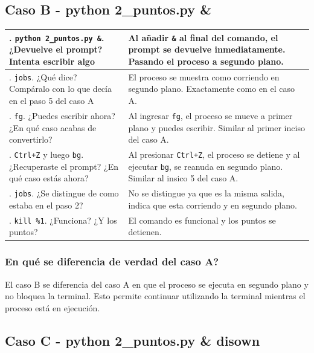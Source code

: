 \documentclass[12pt, letterpaper]{article}
\begin{document}
\subsection*{\fontsize{12}{17}\selectfont Caso B - python 2\_puntos.py \& }

\renewcommand{\arraystretch}{1.35}
\begin{xltabular}{\textwidth}{|>{\raggedright\arraybackslash}X|>{\raggedright\arraybackslash}X|}
		. \texttt{python 2\_puntos.py \&}. ¿Devuelve el prompt? Intenta escribir algo & Al añadir \texttt{\&} al final del comando, el prompt se devuelve inmediatamente. Pasando el proceso a segundo plano. \\ . \texttt{jobs}. ¿Qué dice? Compáralo con lo que decía en el paso 5 del caso A & El proceso se muestra como corriendo en segundo plano. Exactamente como en el caso A. \\ . \texttt{fg}. ¿Puedes escribir ahora? ¿En qué caso acabas de convertirlo? & Al ingresar \texttt{fg}, el proceso se mueve a primer plano y puedes escribir. Similar al primer inciso del caso A.\\ . \texttt{Ctrl+Z} y luego \texttt{bg}. ¿Recuperaste el prompt? ¿En qué caso estás ahora? & Al presionar \texttt{Ctrl+Z}, el proceso se detiene y al ejecutar \texttt{bg}, se reanuda en segundo plano. Similar al insico 5 del caso A.\\ . \texttt{jobs}. ¿Se distingue de como estaba en el paso 2? & No se distingue ya que es la misma salida, indica que esta corriendo y en segundo plano. \\ . \texttt{kill \%1}. ¿Funciona? ¿Y los puntos? & El comando es funcional y los puntos se detienen.\\ \hline
\end{xltabular}

\subsubsection*{En qué se diferencia de verdad del caso A?}

El caso B se diferencia del caso A en que el proceso se ejecuta en segundo plano y no bloquea la terminal. Esto permite continuar utilizando la terminal mientras el proceso está en ejecución.


\subsection*{\fontsize{12}{17}\selectfont Caso C - python 2\_puntos.py \& disown}
\end{document}
